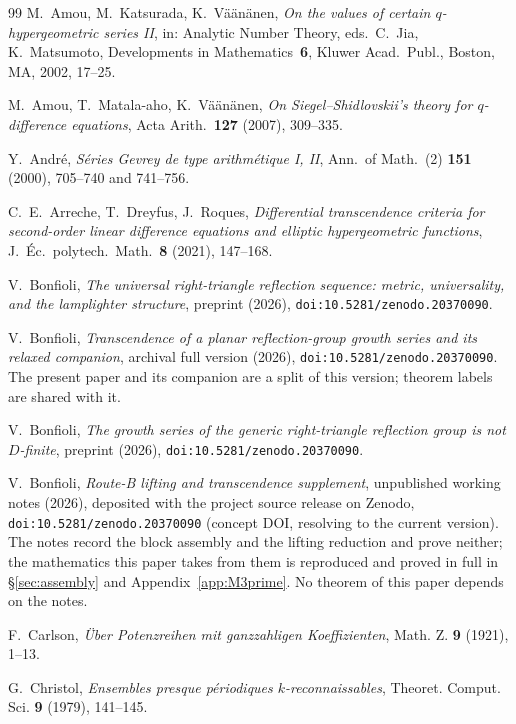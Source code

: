 \documentclass[11pt]{article}
\theoremstyle{plain}
\theoremstyle{definition}
\theoremstyle{remark}
\begin{document}
\begin{thebibliography}{99}
 M.~Amou, M.~Katsurada, K.~V\"a\"an\"anen, \emph{On the values of certain
$q$-hypergeometric series II}, in: Analytic Number Theory, eds.\ C.~Jia, K.~Matsumoto,
Developments in Mathematics~\textbf{6}, Kluwer Acad.\ Publ., Boston, MA, 2002, 17--25.

 M.~Amou, T.~Matala-aho, K.~V\"a\"an\"anen, \emph{On Siegel--Shidlovskii's theory
for $q$-difference equations}, Acta Arith.\ \textbf{127} (2007), 309--335.

 Y.~Andr\'e, \emph{S\'eries Gevrey de type arithm\'etique I, II}, Ann.\ of Math.\
(2) \textbf{151} (2000), 705--740 and 741--756.

 C.~E.~Arreche, T.~Dreyfus, J.~Roques, \emph{Differential transcendence criteria
for second-order linear difference equations and elliptic hypergeometric functions},
J.~\'Ec.\ polytech.\ Math.\ \textbf{8} (2021), 147--168.

 V.~Bonfioli, \emph{The universal right-triangle reflection sequence:
metric, universality, and the lamplighter structure}, preprint (2026),
\texttt{doi:10.5281/zenodo.20370090}.

 V.~Bonfioli, \emph{Transcendence of a planar reflection-group growth
series and its relaxed companion}, archival full version (2026), \texttt{doi:10.5281/zenodo.20370090}.
The present paper and its companion are a split of this version; theorem labels are shared with it.

 V.~Bonfioli, \emph{The growth series of the generic right-triangle
reflection group is not $D$-finite}, preprint (2026), \texttt{doi:10.5281/zenodo.20370090}.

 V.~Bonfioli, \emph{Route-B lifting and transcendence supplement}, unpublished
working notes (2026), deposited with the project source release on Zenodo,
\texttt{doi:10.5281/zenodo.20370090} (concept DOI, resolving to the current version). The notes
record the block assembly and the lifting reduction and prove neither; the mathematics this paper
takes from them is reproduced and proved in full in \S\ref{sec:assembly} and
Appendix~\ref{app:M3prime}. No
theorem of this paper depends on the notes.

 F.~Carlson, \emph{\"Uber Potenzreihen mit ganzzahligen Koeffizienten},
Math. Z. \textbf{9} (1921), 1--13.

 G.~Christol, \emph{Ensembles presque p\'eriodiques $k$-reconnaissables},
Theoret. Comput. Sci. \textbf{9} (1979), 141--145.


\end{thebibliography}
\end{document}
